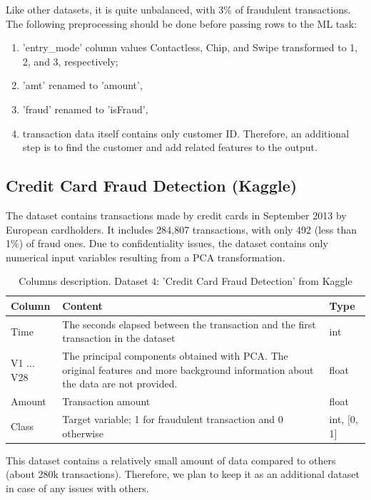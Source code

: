 \documentclass[12pt,a4paper, hidelinks]{article}
\begin{document}
Like other datasets, it is quite unbalanced, with 3\% of fraudulent transactions. The following preprocessing should be done before passing rows to the ML task:
\begin{enumerate}
    \item 'entry\_mode' column values Contactless, Chip, and Swipe transformed to 1, 2, and 3, respectively;
    \item 'amt' renamed to 'amount',
    \item 'fraud' renamed to 'isFraud',
    \item transaction data itself contains only customer ID. Therefore, an additional step is to find the customer and add related features to the output.
\end{enumerate}


\subsection{Credit Card Fraud Detection (Kaggle)}

The dataset contains transactions made by credit cards in September 2013 by European cardholders. It includes 284,807 transactions, with only 492 (less than 1\%) of fraud ones. Due to confidentiality issues, the dataset contains only numerical input variables resulting from a PCA transformation.

\begin{table}[ht!]
    \centering
    \begin{tabular}{|p{2.5cm}|p{10cm}|p{2cm}|}
    \hline
    \textbf{Column} & \textbf{Content} & \textbf{Type} \\
    \hline
    Time & The seconds elapsed between the transaction and the first transaction in the dataset & int \\
    \hline
    V1 ... V28 & The principal components obtained with PCA. The original features and more background information about the data are not provided. & float \\
    \hline
    Amount & Transaction amount & float \\
    \hline
    Class & Target variable; 1 for fraudulent transaction and 0 otherwise & int, [0, 1] \\
    \hline
    \end{tabular}
    \caption{Columns description. Dataset 4: 'Credit Card Fraud Detection' from Kaggle}
\end{table}

This dataset contains a relatively small amount of data compared to others (about 280k transactions). Therefore, we plan to keep it as an additional dataset in case of any issues with others.
\end{document}
